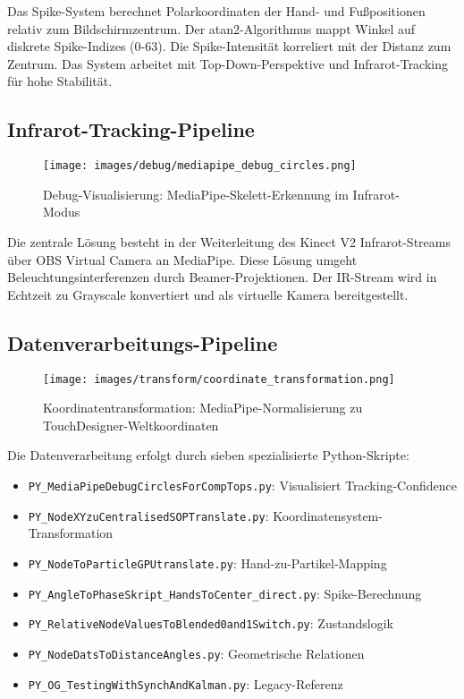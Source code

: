 Das Spike-System berechnet Polarkoordinaten der Hand- und Fußpositionen relativ zum Bildschirmzentrum. Der atan2-Algorithmus mappt Winkel auf diskrete Spike-Indizes (0-63). Die Spike-Intensität korreliert mit der Distanz zum Zentrum. Das System arbeitet mit Top-Down-Perspektive und Infrarot-Tracking für hohe Stabilität.

\subsection{Infrarot-Tracking-Pipeline}

\begin{figure}[h]
    \centering
    \texttt{[image: images/debug/mediapipe\_debug\_circles.png]}
    \caption{Debug-Visualisierung: MediaPipe-Skelett-Erkennung im Infrarot-Modus}
    \label{fig:debug_circles}
\end{figure}

Die zentrale Lösung besteht in der Weiterleitung des Kinect V2 Infrarot-Streams über OBS Virtual Camera an MediaPipe. Diese Lösung umgeht Beleuchtungsinterferenzen durch Beamer-Projektionen. Der IR-Stream wird in Echtzeit zu Grayscale konvertiert und als virtuelle Kamera bereitgestellt.

\subsection*{Datenverarbeitungs-Pipeline}

\begin{figure}[h]
    \centering
    \texttt{[image: images/transform/coordinate\_transformation.png]}
    \caption{Koordinatentransformation: MediaPipe-Normalisierung zu TouchDesigner-Weltkoordinaten}
    \label{fig:coordinate_transform}
\end{figure}

Die Datenverarbeitung erfolgt durch sieben spezialisierte Python-Skripte:

\begin{itemize}
    \item \texttt{PY\_MediaPipeDebugCirclesForCompTops.py}: Visualisiert Tracking-Confidence
    \item \texttt{PY\_NodeXYzuCentralisedSOPTranslate.py}: Koordinatensystem-Transformation
    \item \texttt{PY\_NodeToParticleGPUtranslate.py}: Hand-zu-Partikel-Mapping
    \item \texttt{PY\_AngleToPhaseSkript\_HandsToCenter\_direct.py}: Spike-Berechnung
    \item \texttt{PY\_RelativeNodeValuesToBlended0and1Switch.py}: Zustandslogik
    \item \texttt{PY\_NodeDatsToDistanceAngles.py}: Geometrische Relationen
    \item \texttt{PY\_OG\_TestingWithSynchAndKalman.py}: Legacy-Referenz
\end{itemize}

